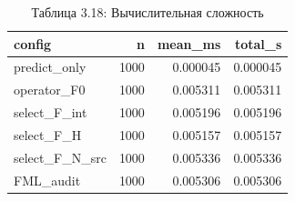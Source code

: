 \begin{table}[htbp]
\caption{Таблица 3.18: Вычислительная сложность}
\label{tab:3_18}
\begin{tabular}{lrrr}
\toprule
config & n & mean\_ms & total\_s \\
\midrule
predict\_only & 1000 & 0.000045 & 0.000045 \\
operator\_F0 & 1000 & 0.005311 & 0.005311 \\
select\_F\_int & 1000 & 0.005196 & 0.005196 \\
select\_F\_H & 1000 & 0.005157 & 0.005157 \\
select\_F\_N\_src & 1000 & 0.005336 & 0.005336 \\
FML\_audit & 1000 & 0.005306 & 0.005306 \\
\bottomrule
\end{tabular}
\end{table}
